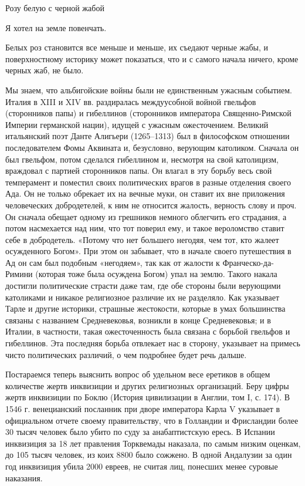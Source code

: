 Розу белую с черной жабой

Я хотел на земле повенчать.

Белых роз становится все меньше и меньше, их съедают черные жабы, и
поверхностному историку может показаться, что и с самого начала ничего, кроме
черных жаб, не было.

Мы знаем, что альбигойские войны были не единственным ужасным событием. Италия
в XIII и XIV вв. раздиралась междуусобной войной гвельфов (сторонников папы) и
гибеллинов (сторонников императора Священно-Римской Империи германской нации),
идущей с ужасным ожесточением. Великий итальянский поэт Данте Алигьери
(1265--1313) был в философском отношении последователем Фомы Аквината и,
безусловно, верующим католиком. Сначала он был гвельфом, потом сделался
гибеллином и, несмотря на свой католицизм, враждовал с партией сторонников
папы. Он влагал в эту борьбу весь свой темперамент и поместил своих
политических врагов в разные отделения своего Ада. Он не только обрекает их на
вечные муки, он ставит их вне приложения человеческих добродетелей, к ним не
относится жалость, верность слову и проч. Он сначала обещает одному из
грешников немного облегчить его страдания, а потом насмехается над ним, что тот
поверил ему, и такое вероломство ставит себе в добродетель. «Потому что нет
большего негодяя, чем тот, кто жалеет осужденного Богом». При этом он забывает,
что в начале своего путешествия в Ад он сам был подобным «негодяем», так как от
жалости к Франческо-да-Римини (которая тоже была осуждена Богом) упал на землю.
Такого накала достигли политические страсти даже там, где обе стороны были
верующими католиками и никакое религиозное различие их не разделяло. Как
указывает Тарле и другие историки, страшные жестокости, которые в умах
большинства связаны с названием Средневековья, возникли в конце Средневековья;
и в Италии, в частности, такая ожесточенность была связана с борьбой гвельфов и
гибеллинов. Эта последняя борьба отвлекает нас в сторону, указывает на примесь
чисто политических различий, о чем подробнее будет речь дальше.

Постараемся теперь выяснить вопрос об удельном весе еретиков в общем количестве
жертв инквизиции и других религиозных организаций. Беру цифры жертв инквизиции
по Боклю (История цивилизации в Англии, том I, с. 174). В 1546 г. венецианский
посланник при дворе императора Карла V указывает в официальном отчете своему
правительству, что в Голландии и Фрисландии более 30 тысяч человек было убито
по суду за анабаптистскую ересь. В Испании инквизиция за 18 лет правления
Торквемады наказала, по самым низким оценкам, до 105 тысяч человек, из коих
8800 было сожжено. В одной Андалузии за один год инквизиция убила 2000 евреев,
не считая лиц, понесших менее суровые наказания.

